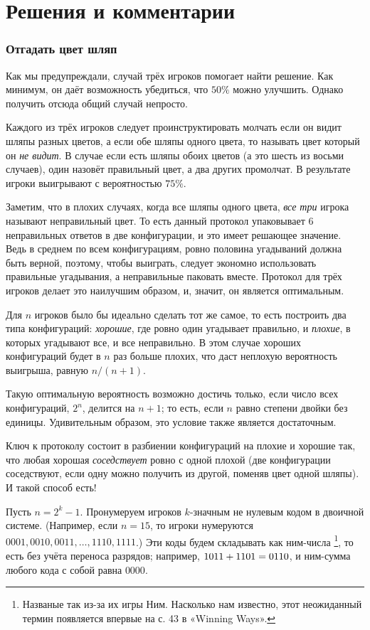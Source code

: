 \section*{Решения и комментарии}

\subsubsection*{Отгадать цвет шляп}

Как мы предупреждали, случай трёх игроков помогает найти решение.
Как минимум, он даёт возможность убедиться, что $50\%$ можно улучшить.
Однако получить отсюда общий случай непросто.

Каждого из трёх игроков следует проинструктировать молчать если он видит шляпы разных цветов,
а если обе шляпы одного цвета, то называть цвет который он \emph{не видит}.
В случае если есть шляпы обоих цветов (а это шесть из восьми случаев), один назовёт правильный цвет, а два других промолчат.
В результате игроки выигрывают с вероятностью $75\%$.

Заметим, что в плохих случаях, когда все шляпы одного цвета, \emph{все три} игрока называют неправильный цвет.
То есть данный протокол упаковывает 6 неправильных ответов в две конфигурации, и это имеет решающее значение.
Ведь в среднем по всем конфигурациям, ровно половина угадываний должна быть верной, поэтому, чтобы выиграть, следует экономно использовать правильные угадывания, а неправильные паковать вместе.
Протокол для трёх игроков делает это наилучшим образом, и, значит, он является оптимальным.

Для $n$ игроков было бы идеально сделать тот же самое,
то есть построить два типа конфигураций: \emph{хорошие}, где ровно один угадывает правильно, и \emph{плохие}, в которых угадывают все, и все неправильно.
В этом случае хороших конфигураций будет в $n$ раз больше плохих,
что даст неплохую вероятность выигрыша, равную $n/(n+1)$.

Такую оптимальную вероятность возможно достичь только, если число всех конфигураций, $2^n$, делится на $n+1$;
то есть, если $n$ равно степени двойки без единицы.
Удивительным образом, это условие также является достаточным.

Ключ к протоколу состоит в разбиении конфигураций на плохие и хорошие так, что любая хорошая \emph{соседствует} ровно с одной плохой (две конфигурации соседствуют, если одну можно получить из другой, поменяв цвет одной шляпы).
И такой способ есть!

Пусть $n=2^k-1$.
Пронумеруем игроков $k$-значным не нулевым кодом в двоичной системе.
(Например, если $n=15$, то игроки нумеруются $0001,0010,0011,\dots,1110,1111$.)
Эти коды будем складывать как ним-числа%
\footnote{Названые так из-за их игры Ним.
Насколько нам известно, этот неожиданный термин появляется впервые на с. 43 в «Winning Ways».}, то есть без учёта переноса разрядов;
например, $1011 \z+ 1101 =0110$, и ним-сумма любого кода с собой равна $0000$.

